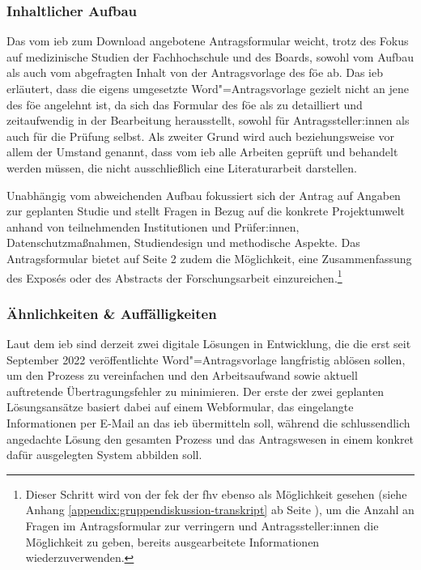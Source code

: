 \documentclass[a4paper,12pt,twoside]{scrreprt}
\begin{document}
\subsubsection*{Inhaltlicher Aufbau}
\label{sub-sub-sec:fh-oö-inhaltlicher-aufbau}

Das vom \ac{ieb} zum Download angebotene Antragsformular weicht, trotz des Fokus auf medizinische Studien der Fachhochschule und des Boards, sowohl vom Aufbau als auch vom abgefragten Inhalt von der Antragsvorlage des \ac{föe} ab. Das \ac{ieb} erläutert, dass die eigens umgesetzte Word"=Antragsvorlage gezielt nicht an jene des \ac{föe} angelehnt ist, da sich das Formular des \ac{föe} als zu detailliert und zeitaufwendig in der Bearbeitung herausstellt, sowohl für Antragssteller:innen als auch für die Prüfung selbst. Als zweiter Grund wird auch beziehungsweise vor allem der Umstand genannt, dass vom \ac{ieb} alle Arbeiten geprüft und behandelt werden müssen, die nicht ausschließlich eine Literaturarbeit darstellen. \cite{rosendahl-huber_extern-erfahrungen_2023}

\medskip

Unabhängig vom abweichenden Aufbau fokussiert sich der Antrag auf Angaben zur geplanten Studie und stellt Fragen in Bezug auf die konkrete Projektumwelt anhand von teilnehmenden Institutionen und Prüfer:innen, Datenschutzmaßnahmen, Studiendesign und methodische Aspekte. Das Antragsformular bietet auf Seite 2 zudem die Möglichkeit, eine Zusammenfassung des Exposés oder des Abstracts der Forschungsarbeit einzureichen.\footnote{Dieser Schritt wird von der \ac{fek} der \ac{fhv} ebenso als Möglichkeit gesehen (siehe Anhang \ref{appendix:gruppendiskussion-transkript} ab Seite \pageref{appendix:gruppendiskussion-transkript}), um die Anzahl an Fragen im Antragsformular zur verringern und Antragssteller:innen die Möglichkeit zu geben, bereits ausgearbeitete Informationen wiederzuverwenden.}

\subsubsection*{Ähnlichkeiten \& Auffälligkeiten}
\label{sub-sub-sec:ähnlichkeiten-auffälligkeiten-fh-oö}

Laut dem \ac{ieb} sind derzeit zwei digitale Lösungen in Entwicklung, die die erst seit September 2022 veröffentlichte Word"=Antragsvorlage langfristig ablösen sollen, um den Prozess zu vereinfachen und den Arbeitsaufwand sowie aktuell auftretende Übertragungsfehler zu minimieren. Der erste der zwei geplanten Lösungsansätze basiert dabei auf einem Webformular, das eingelangte Informationen per E-Mail an das \ac{ieb} übermitteln soll, während die schlussendlich angedachte Lösung den gesamten Prozess und das Antragswesen in einem konkret dafür ausgelegten System abbilden soll. \cite{rosendahl-huber_extern-erfahrungen_2023}
\end{document}
